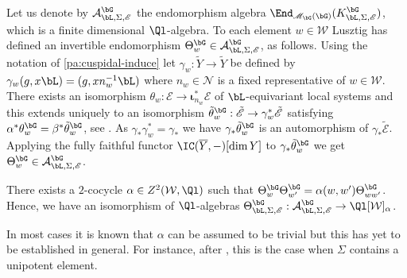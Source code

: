 \documentclass[eqthmnum,nocolour,skinny]{jt-calcs}
\begin{document}
\begin{pa}\label{pa:Lusztig-basis}
Let us denote by $\mathcal{A}_{\bL,\Sigma,\mathscr{E}}^{\bG}$ the endomorphism algebra $\End_{\mathscr{M}_{\bG}(\bG)}(K_{\bL,\Sigma,\mathscr{E}}^{\bG})$, which is a finite dimensional $\Ql$-algebra. To each element $w \in \mathcal{W}$ Lusztig has defined an invertible endomorphism $\Theta_w^{\bG} \in \mathcal{A}_{\bL,\Sigma,\mathscr{E}}^{\bG}$, as follows. Using the notation of \cref{pa:cuspidal-induce} let $\gamma_w : \tilde{Y} \to \tilde{Y}$ be defined by $\gamma_w(g,x\bL) = (g,xn_w^{-1}\bL)$ where $n_w \in \mathcal{N}$ is a fixed representative of $w \in \mathcal{W}$. There exists an isomorphism $\theta_w : \mathscr{E} \to \boldsymbol{\iota}_{n_w}^*\mathscr{E}$ of $\bL$-equivariant local systems and this extends uniquely to an isomorphism $\tilde{\theta}_w^{\bG} : \tilde{\mathscr{E}} \to \gamma_w^*\tilde{\mathscr{E}}$ satisfying $\alpha^*\theta_w^{\bG} = \beta^*\tilde{\theta}_w^{\bG}$, see \cite[Prop.~3.5]{lusztig:1984:intersection-cohomology-complexes}. As $\gamma_*\gamma_w^* = \gamma_*$ we have $\gamma_*\tilde{\theta}_w^{\bG}$ is an automorphism of $\gamma_*\tilde{\mathscr{E}}$. Applying the fully faithful functor $\IC(\overline{Y},-)[\dim Y]$ to $\gamma_*\tilde{\theta}_w^{\bG}$ we get $\Theta_w^{\bG} \in \mathcal{A}_{\bL,\Sigma,\mathscr{E}}^{\bG}$.
\end{pa}

\begin{thm}\label{thm:twisted-algebra}
There exists a $2$-cocycle $\alpha \in Z^2(\mathcal{W},\Ql)$ such that $\Theta_w^{\bG}\Theta_{w'}^{\bG} = \alpha(w,w')\Theta_{ww'}^{\bG}$. Hence, we have an isomorphism of $\Ql$-algebras $\Theta_{\bL,\Sigma,\mathscr{E}}^{\bG} : \mathcal{A}_{\bL,\Sigma,\mathscr{E}}^{\bG} \to \Ql[\mathcal{W}]_{\alpha}$.
\end{thm}

\begin{rem}
In most cases it is known that $\alpha$ can be assumed to be trivial but this has yet to be established in general. For instance, after \cite[Thm.~9.2]{lusztig:1984:characters-of-reductive-groups-over-finite-fields}, this is the case when $\Sigma$ contains a unipotent element.
\end{rem}
\end{document}
